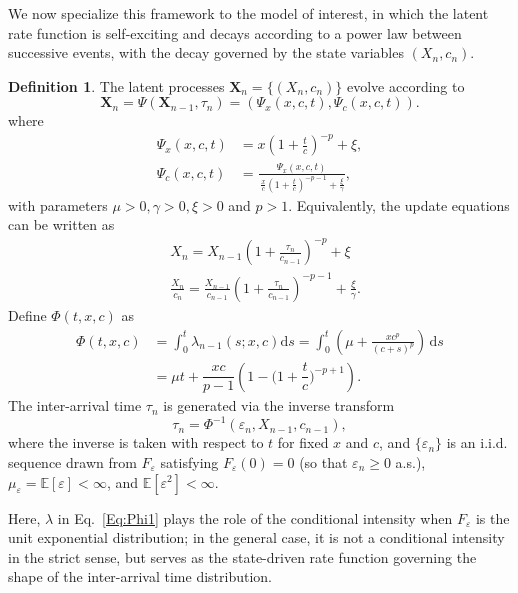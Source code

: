 \documentclass[11pt]{article}
\newcommand{\D}{\mathrm{d}}
\theoremstyle{definition}
\newtheorem{definition}{Definition}
\begin{document}
We now specialize this framework to the model of interest, 
in which the latent rate function is self-exciting and decays 
according to a power law between successive events, 
with the decay governed by the state variables $(X_n, c_n)$.

\begin{definition}\label{Def:Model}
	The latent processes $\mathbf{X}_n = \{(X_n, c_n)\}$ evolve according to 
	\begin{equation}
		\mathbf{X}_n = \Psi(\mathbf{X}_{n-1}, \tau_n) = (\Psi_x(x, c, t), \Psi_c(x, c, t)).
		\label{Eq:Psi}
	\end{equation}
	where
	\begin{align}
		\Psi_x(x, c, t) &= x \left(1 + \frac{t}{c}\right)^{-p} + \xi,  \label{Eq:Psi_x}\\
		\Psi_c(x, c, t) &= \frac{\Psi_x(x, c, t)}{\,\frac{x}{c} \left(1 + \tfrac{t}{c}\right)^{-p-1} + \tfrac{\xi}{\gamma}}, \label{Eq:Psi_c}
	\end{align}
	with parameters $\mu> 0, \gamma> 0, \xi > 0$ and $p>1$.
	Equivalently, the update equations can be written as
	\begin{align*}
		&X_n = X_{n-1} \left(1  + \frac{\tau_n}{c_{n-1}} \right)^{-p} + \xi \\
		&\frac{X_n}{c_n} =  \frac{X_{n-1}}{c_{n-1}} \left(1  + \frac{\tau_n}{c_{n-1}} \right)^{-p-1} + \frac{\xi}{\gamma}.
	\end{align*}
	Define $\Phi(t, x, c)$ as
	\begin{align}
		\Phi(t, x, c) & = \int_0^t  \lambda_{n-1}(s; x, c) \D s= \int_0^t \left( \mu + \frac{x c^p}{(c+s)^p} \right)\, \D s \label{Eq:Phi1}\\
		& = \mu t + \dfrac{x c}{p-1}\left( 1 - \bigg(1+\dfrac{t}{c}\bigg)^{-p+1}  \right). \label{Eq:Phi}
	\end{align}
	The inter-arrival time $\tau_n$ is generated via the inverse transform
	\[
	\tau_n = \Phi^{-1}(\varepsilon_n,  X_{n-1}, c_{n-1}),
	\]
	where the inverse is taken with respect to $t$ for fixed $x$ and $c$,
	and $\{\varepsilon_n\}$ is an i.i.d. sequence drawn from $F_\varepsilon$
	satisfying $F_\varepsilon(0) = 0$ (so that $\varepsilon_n \ge 0$ a.s.), $\mu_{\varepsilon} = \mathbb{E}[\varepsilon] < \infty$,
	and $\mathbb{E}[\varepsilon^2] < \infty$.
\end{definition}

Here, $\lambda$ in Eq.~\eqref{Eq:Phi1} plays the role 
of the conditional intensity when $F_\varepsilon$ is the unit exponential 
distribution; in the general case, it is not a conditional intensity 
in the strict sense, but serves as the state-driven rate function 
governing the shape of the inter-arrival time distribution.
\end{document}

